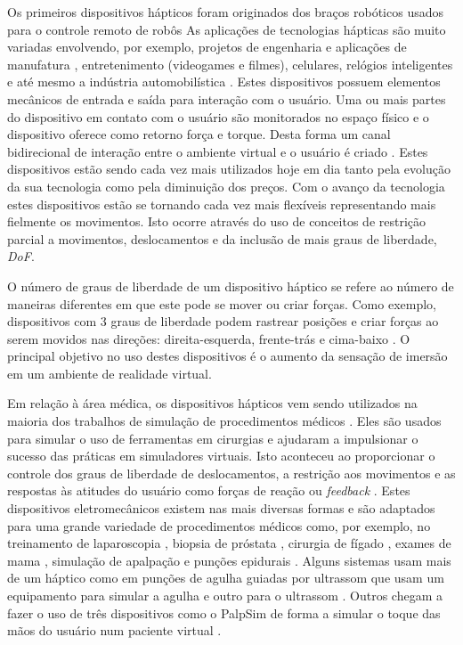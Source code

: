 Os primeiros dispositivos hápticos foram originados dos braços robóticos usados para o controle remoto de robôs \cite{Zurawski2005} As aplicações de tecnologias hápticas são muito variadas envolvendo, por exemplo, projetos de engenharia e aplicações de manufatura \cite{Sharma2001}, entretenimento (videogames e filmes), celulares, relógios inteligentes e até mesmo a indústria automobilística \cite{Smith2019}. Estes dispositivos possuem elementos mecânicos de entrada e saída para interação com o usuário. Uma ou mais partes do dispositivo em contato com o usuário são monitorados no espaço físico e o dispositivo oferece como retorno força e torque. Desta forma um canal bidirecional de interação entre o ambiente virtual e o usuário é criado \cite{Coles2011}. Estes dispositivos estão sendo cada vez mais utilizados hoje em dia tanto pela evolução da sua tecnologia como pela diminuição dos preços. Com o avanço da tecnologia estes dispositivos estão se tornando cada vez mais flexíveis representando mais fielmente os movimentos. Isto ocorre  através do uso de conceitos de restrição parcial a movimentos, deslocamentos e da inclusão de mais graus de liberdade, \textit{\acrfull{DoF}}. 

O número de graus de liberdade de um dispositivo háptico se refere ao número de maneiras diferentes em que este pode se mover ou criar forças. Como exemplo, dispositivos com 3 graus de liberdade podem rastrear posições e criar forças ao serem movidos nas direções: direita-esquerda, frente-trás e cima-baixo \cite{HAPTICSHOUSE2019}. O principal objetivo no uso destes dispositivos é o aumento da sensação de imersão em um ambiente de realidade virtual. 

Em relação à área médica, os dispositivos hápticos vem sendo utilizados na maioria dos trabalhos de simulação de procedimentos médicos \cite{Coles2011,Escobar-Castillejos2016}. Eles são usados para simular o uso de ferramentas em cirurgias e ajudaram a impulsionar o sucesso das práticas em simuladores virtuais. Isto aconteceu ao proporcionar o controle dos graus de liberdade de deslocamentos, a restrição aos movimentos e as respostas às atitudes do usuário como forças de reação ou \textit{feedback} \cite{Gerovich2004}. Estes dispositivos eletromecânicos existem nas mais diversas formas e são adaptados para uma grande variedade de procedimentos médicos como, por exemplo, no treinamento de laparoscopia \cite{Srinivasan2004}, biopsia de próstata \cite{Sclaverano2009}, cirurgia de fígado \cite{Mastmeyer2016}, exames de mama \cite{Brazil2017,Jeon2010,Ribeiro2014,Solanki2010}, simulação de apalpação \cite{Ribeiro2016} e punções epidurais \cite{N.2013, Brazil2018}. Alguns sistemas usam mais de um háptico como em punções de agulha guiadas por ultrassom que usam um equipamento para simular a agulha e outro para o ultrassom \cite{Ni2011,Vidal2008}. Outros chegam a fazer o uso de três dispositivos como o PalpSim de forma a simular o toque das mãos do usuário num paciente virtual \cite{Coles2011b}. 

